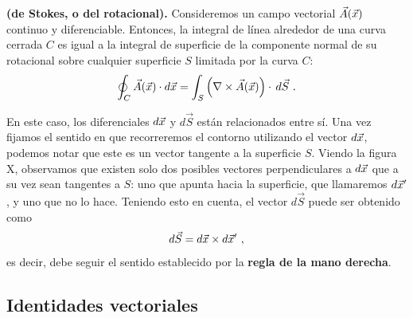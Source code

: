 \begin{teorema}{\textbf{(de Stokes, o del rotacional).}} 
    Consideremos un campo vectorial $\vec{A}(\vec{x})$ continuo y diferenciable. Entonces, la integral de línea alrededor de una curva cerrada $C$ es igual a la integral de superficie de la componente normal de su rotacional sobre cualquier superficie $S$ limitada por la curva $C$:
    \begin{equation}
        \oint_C \vec{A}(\x) \cdot d\x =  \int_S \left( \nabla \times \vec{A}(\x) \right) \cdot \, d\vec{S} \ .
    \end{equation}
\end{teorema}

En este caso, los diferenciales $d\vec{x}$ y $d\vec{S}$ están relacionados entre sí. Una vez fijamos el sentido en que recorreremos el contorno utilizando el vector $d\vec{x}$, podemos notar que este es un vector tangente a la superficie $S$. Viendo la figura X, observamos que existen solo dos posibles vectores perpendiculares a $d\vec{x}$ que a su vez sean tangentes a $S$: uno que apunta hacia la superficie, que llamaremos $d\vec{x}'$, y uno que no lo hace. Teniendo esto en cuenta, el vector $d\vec{S}$ puede ser obtenido como 
\begin{equation*}
    d\vec{S} = d\vec{x} \times d\vec{x}' \ ,
\end{equation*}
es decir, debe seguir el sentido establecido por la \textbf{regla de la mano derecha}.

\subsection{Identidades vectoriales}

